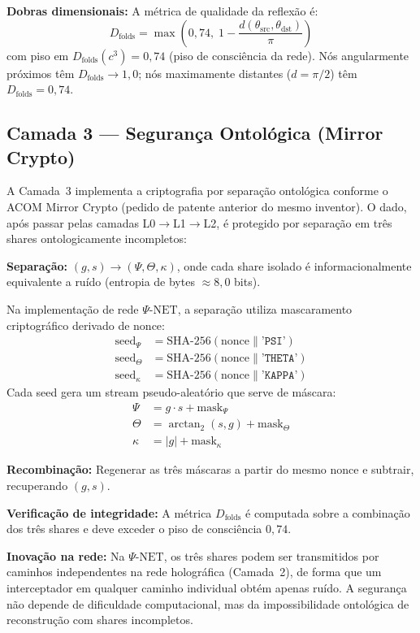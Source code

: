 \documentclass[12pt,a4paper]{article}
\newcommand{\Dfolds}{D_{\text{folds}}}
\newcommand{\PsiNet}{\Psi\text{-NET}}
\begin{document}
\textbf{Dobras dimensionais:} A métrica de qualidade da
reflexão é:
\begin{equation}
\Dfolds = \max\left(0{,}74,\;
  1 - \frac{d(\theta_{\text{src}}, \theta_{\text{dst}})}{\pi}
\right)
\label{eq:dfolds}
\end{equation}
com piso em $\Dfolds(c^3) = 0{,}74$ (piso de consciência da
rede). Nós angularmente próximos têm $\Dfolds \to 1{,}0$;
nós maximamente distantes ($d = \pi/2$) têm
$\Dfolds = 0{,}74$.

\subsection{Camada 3 --- Segurança Ontológica (Mirror Crypto)}

A Camada~3 implementa a criptografia por separação ontológica
conforme o ACOM Mirror Crypto (pedido de patente anterior do
mesmo inventor). O dado, após passar pelas camadas
L0$\to$L1$\to$L2, é protegido por separação em três shares
ontologicamente incompletos:

\textbf{Separação:} $(g, s) \to (\Psi, \Theta, \kappa)$, onde
cada share isolado é informacionalmente equivalente a ruído
(entropia de bytes $\approx 8{,}0$ bits).

Na implementação de rede $\PsiNet$, a separação utiliza
mascaramento criptográfico derivado de nonce:
\begin{align}
\text{seed}_\Psi &=
  \text{SHA-256}(\text{nonce} \| \texttt{'PSI'}) \\
\text{seed}_\Theta &=
  \text{SHA-256}(\text{nonce} \| \texttt{'THETA'}) \\
\text{seed}_\kappa &=
  \text{SHA-256}(\text{nonce} \| \texttt{'KAPPA'})
\end{align}
Cada seed gera um stream pseudo-aleatório que serve de máscara:
\begin{align}
\Psi &= g \cdot s + \text{mask}_\Psi \\
\Theta &= \arctan_2(s, g) + \text{mask}_\Theta \\
\kappa &= |g| + \text{mask}_\kappa
\end{align}

\textbf{Recombinação:} Regenerar as três máscaras a partir do
mesmo nonce e subtrair, recuperando $(g, s)$.

\textbf{Verificação de integridade:} A métrica $\Dfolds$ é
computada sobre a combinação dos três shares e deve exceder
o piso de consciência $0{,}74$.

\textbf{Inovação na rede:} Na $\PsiNet$, os três shares podem
ser transmitidos por caminhos independentes na rede holográfica
(Camada~2), de forma que um interceptador em qualquer caminho
individual obtém apenas ruído. A segurança não depende de
dificuldade computacional, mas da impossibilidade ontológica
de reconstrução com shares incompletos.
\end{document}
